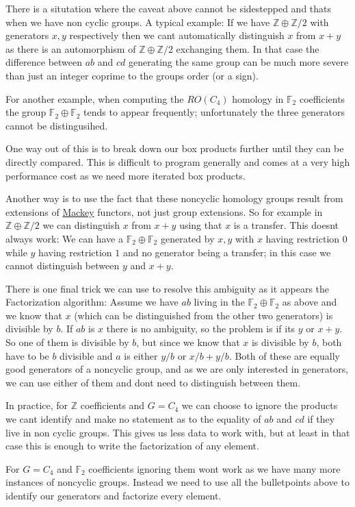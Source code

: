 \begin{DoxyItemize}
\item There is a situtation where the caveat above cannot be sidestepped and that\textquotesingle{}s when we have non cyclic groups. A typical example\+: If we have $\mathbb Z\oplus \mathbb Z/2$ with generators $x,y$ respectively then we can\textquotesingle{}t automatically distinguish $x$ from $x+y$ as there is an automorphism of $\mathbb Z\oplus \mathbb Z/2$ exchanging them. In that case the difference between $ab$ and $cd$ generating the same group can be much more severe than just an integer coprime to the group\textquotesingle{}s order (or a sign).
\item For another example, when computing the $RO(C_4)$ homology in $\mathbb F_2$ coefficients the group $\mathbb F_2\oplus \mathbb F_2$ tends to appear frequently; unfortunately the three generators cannot be distingusihed.
\item One way out of this is to break down our box products further until they can be directly compared. This is difficult to program generally and comes at a very high performance cost as we need more iterated box products.
\item Another way is to use the fact that these noncyclic homology groups result from extensions of \hyperlink{namespaceMackey}{Mackey} functors, not just group extensions. So for example in $\mathbb Z\oplus \mathbb Z/2$ we can distinguish $x$ from $x+y$ using that $x$ is a transfer. This doesn\textquotesingle{}t always work\+: We can have a $\mathbb F_2\oplus \mathbb F_2$ generated by $x,y$ with $x$ having restriction $0$ while $y$ having restriction $1$ and no generator being a transfer; in this case we cannot distinguish between $y$ and $x+y$.
\item There is one final trick we can use to resolve this ambiguity as it appears the Factorization algorithm\+: Assume we have $ab$ living in the $\mathbb F_2\oplus \mathbb F_2$ as above and we know that $x$ (which can be distinguished from the other two generators) is divisible by $b$. If $ab$ is $x$ there is no ambiguity, so the problem is if it\textquotesingle{}s $y$ or $x+y$. So one of them is divisible by $b$, but since we know that $x$ is divisible by $b$, both have to be $b$ divisible and $a$ is either $y/b$ or $x/b+y/b$. Both of these are equally good generators of a noncyclic group, and as we are only interested in generators, we can use either of them and don\textquotesingle{}t need to distinguish between them.
\end{DoxyItemize}

In practice, for $\mathbb Z$ coefficients and $G=C_4$ we can choose to ignore the products we can\textquotesingle{}t identify and make no statement as to the equality of $ab$ and $cd$ if they live in non cyclic groups. This gives us less data to work with, but at least in that case this is enough to write the factorization of any element.

For $G=C_4$ and $\mathbb F_2$ coefficients ignoring them won\textquotesingle{}t work as we have many more instances of noncyclic groups. Instead we need to use all the bulletpoints above to identify our generators and factorize every element. 